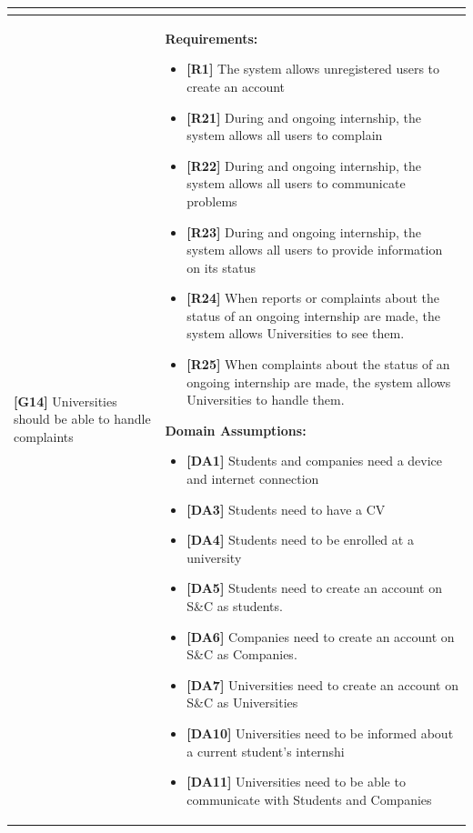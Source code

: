 \begin{longtable}{|p{}|p{}|}
\begin{itemize}
\end{itemize} \\
\hline
\textbf{[G14]} Universities should be able to handle complaints
& 
\textbf{Requirements:}
\begin{itemize}
    \item \textbf{[R1]} The system allows unregistered users to create an account
    \item \textbf{[R21]} During and ongoing internship, the system allows all users to complain
    \item \textbf{[R22]} During and ongoing internship, the system allows all users to communicate problems
    \item \textbf{[R23]} During and ongoing internship, the system allows all users to provide information on its status
    \item \textbf{[R24]} When reports or complaints about the status of an ongoing internship are made, the system allows Universities to see them.
    \item \textbf{[R25]} When complaints about the status of an ongoing internship are made, the system allows Universities to handle them.
\end{itemize}
\textbf{Domain Assumptions:}
\begin{itemize}
    \item \textbf{[DA1]} Students and companies need a device and internet connection
     \item \textbf{[DA3]} Students need to have a CV
     \item \textbf{[DA4]} Students need to be enrolled at a university
    \item \textbf{[DA5]} Students need to create an account on S\&C as students.
    \item \textbf{[DA6]} Companies need to create an account on S\&C as Companies.
    \item \textbf{[DA7]} Universities need to create an account on S\&C as Universities
    \item \textbf{[DA10]} Universities need to be informed about a current student’s internshi
    \item \textbf{[DA11]} Universities need to be able to communicate with Students and Companies

\end{itemize} \\
\hline
\end{longtable}

\pagebreak

